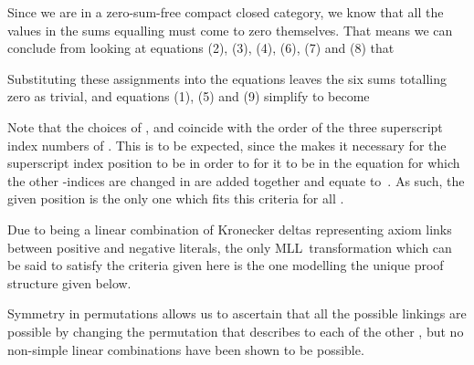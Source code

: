 \documentclass{LMCS}
\theoremstyle{plain}\newtheorem*{cLm}{Claim}
\newcommand{\mll}{MLL} \newcommand{\mall}{MALL}
\begin{document}
    Since we are in a zero-sum-free compact closed category, we know that all the values in the sums equalling  must come to zero themselves. That means we can conclude from looking at equations (2), (3), (4), (6), (7) and (8) that
    
    Substituting these assignments into the  equations leaves the six sums totalling zero as trivial, and equations (1), (5) and (9) simplify to become
    
    Note that the choices of ,  and  coincide with the order of the three superscript index numbers of . This is to be expected, since the  makes it necessary for the  superscript index position to be  in order to for it to be in the equation for which the other  -indices are changed in are added together and equate to~. As such, the given position is the only one which fits this criteria for all .
    
    Due to  being a linear combination of Kronecker deltas representing axiom links between positive and negative literals, the only \mll~transformation which can be said to satisfy the criteria given here is the one modelling the unique proof structure given below.
    
    \begin{center} \vspace{5mm}
         \vspace{5mm}
    \end{center}
    Symmetry in permutations allows us to ascertain that all the possible linkings are possible by changing the permutation that  describes to each of the other , but no non-simple linear combinations have been shown to be possible.
    
\end{document}
